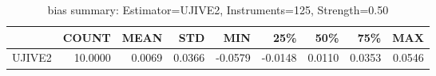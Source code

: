 \begin{table}[ht]
\centering
\caption{bias summary: Estimator=UJIVE2, Instruments=125, Strength=0.50}
\begin{tabular}{lrrrrrrrr}
\toprule
 & COUNT & MEAN & STD & MIN & 25\% & 50\% & 75\% & MAX \\
\midrule
UJIVE2 & 10.0000 & 0.0069 & 0.0366 & -0.0579 & -0.0148 & 0.0110 & 0.0353 & 0.0546 \\
\bottomrule
\end{tabular}
\end{table}
